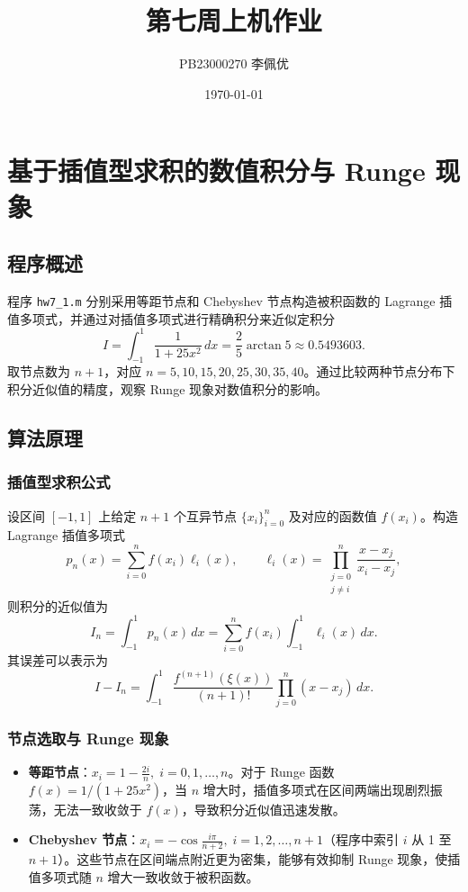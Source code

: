 \documentclass[12pt,a4paper]{article}
\title{第七周上机作业}
\author{PB23000270 李佩优}
\date{\today}
\begin{document}
\maketitle

\section{基于插值型求积的数值积分与 Runge 现象}

\subsection{程序概述}

程序 \texttt{hw7\_1.m} 分别采用等距节点和 Chebyshev 节点构造被积函数的 Lagrange 插值多项式，并通过对插值多项式进行精确积分来近似定积分
\[
I = \int_{-1}^{1} \frac{1}{1+25x^2}\,dx = \frac{2}{5}\arctan 5 \approx 0.5493603.
\]
取节点数为 \(n+1\)，对应 \(n=5,10,15,20,25,30,35,40\)。通过比较两种节点分布下积分近似值的精度，观察 Runge 现象对数值积分的影响。

\subsection{算法原理}

\subsubsection{插值型求积公式}
设区间 \([-1,1]\) 上给定 \(n+1\) 个互异节点 \(\{x_i\}_{i=0}^{n}\) 及对应的函数值 \(f(x_i)\)。构造 Lagrange 插值多项式
\[
p_n(x) = \sum_{i=0}^{n} f(x_i) \ell_i(x), \qquad \ell_i(x) = \prod_{\substack{j=0\\j\neq i}}^{n} \frac{x-x_j}{x_i-x_j},
\]
则积分的近似值为
\[
I_n = \int_{-1}^{1} p_n(x)\,dx = \sum_{i=0}^{n} f(x_i) \int_{-1}^{1} \ell_i(x)\,dx.
\]
其误差可以表示为
\[
I - I_n = \int_{-1}^{1} \frac{f^{(n+1)}(\xi(x))}{(n+1)!} \prod_{j=0}^{n}(x-x_j)\,dx.
\]

\subsubsection{节点选取与 Runge 现象}
\begin{itemize}
    \item \textbf{等距节点}：\(x_i = 1 - \frac{2i}{n},\; i=0,1,\dots,n\)。对于 Runge 函数 \(f(x)=1/(1+25x^2)\)，当 \(n\) 增大时，插值多项式在区间两端出现剧烈振荡，无法一致收敛于 \(f(x)\)，导致积分近似值迅速发散。
    \item \textbf{Chebyshev 节点}：\(x_i = -\cos\frac{i\pi}{n+2},\; i=1,2,\dots,n+1\)（程序中索引 \(i\) 从 1 至 \(n+1\)）。这些节点在区间端点附近更为密集，能够有效抑制 Runge 现象，使插值多项式随 \(n\) 增大一致收敛于被积函数。
\end{itemize}
\end{document}
